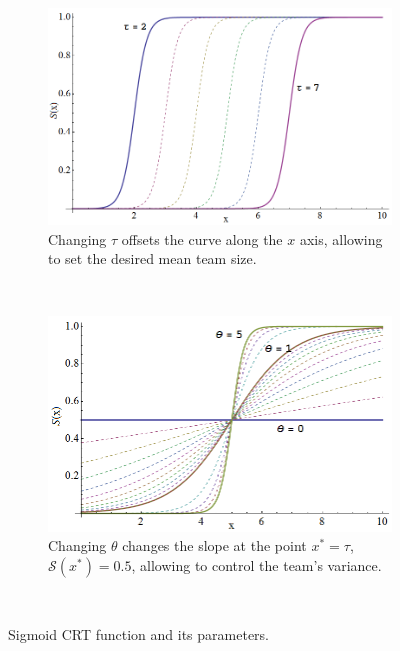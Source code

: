 \documentclass[defaultstyle,12pt]{thesis}
\newcommand{\Sig}{\mathcal{S}}  %
\begin{document}
\begin{figure}[!htb]
\centering\begin{subfigure}{.5\textwidth}
\centering\includegraphics[width=\textwidth]{../assets/sigmoid2.png}
\caption{Changing $\tau$ offsets the curve along the $x$ axis, allowing to set the desired mean team size.}\label{}
\end{subfigure}~
\centering\begin{subfigure}{.5\textwidth}
\centering\includegraphics[width=\textwidth]{../assets/sigmoid1.png}
\caption{Changing $\theta$ changes the slope at the point $x^* = \tau$, $\Sig(x^*) = 0.5$, allowing to control the team's variance.}\label{}
\end{subfigure}~
\caption{Sigmoid CRT function and its parameters.}\label{fig:sig}
\end{figure}
\end{document}
